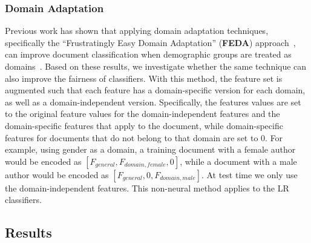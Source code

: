 \subsubsection{Domain Adaptation}

Previous work has shown that applying domain adaptation techniques, specifically the ``Frustratingly Easy Domain Adaptation'' (\textbf{FEDA}) approach~\cite{daume2007frustratingly},
can improve document classification when demographic groups are treated as domains~\cite{volkova2013exploring,lynn2017human}.
Based on these results, we investigate whether the same technique can also improve the fairness of classifiers.
With this method, the feature set is augmented such that each feature has a domain-specific version for each domain, as well as a domain-independent version.
Specifically, the features values are set to the original feature values for the domain-independent features and the domain-specific features that apply to the document, while domain-specific features for documents that do not belong to that domain are set to $0$.
For example, using gender as a domain, a training document with a female author would be encoded as $[F_{general}, F_{domain, female}, 0]$, while a document with a male author would be encoded as $[F_{general}, 0, F_{domain, male}]$.
At test time we only use the domain-independent features.
This non-neural method applies to the LR classifiers.


\subsection{Results}



